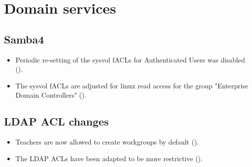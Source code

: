 \section{Domain services}

\subsection{Samba4}
\begin{itemize}
\item Periodic re-setting of the sysvol fACLs for Authenticated Users was disabled ().
\item The sysvol fACLs are adjusted for linux read access for the group "Enterprise Domain Controllers"  ().
\end{itemize}


\subsection{LDAP ACL changes}
\begin{itemize}
\item Teachers are now allowed to create workgroups by default ().
\item The LDAP ACLs have been adapted to be more restrictive ().
\end{itemize}
 



